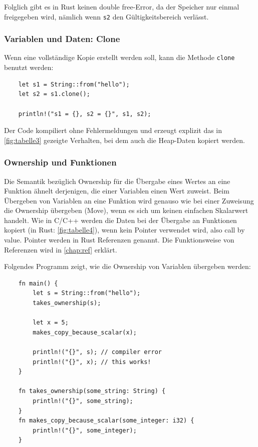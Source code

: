 Folglich gibt es in Rust keinen \glqq double free\grqq{}-Error, da der Speicher nur einmal freigegeben wird, nämlich wenn \verb"s2" den Gültigkeitsbereich verlässt.

\newpage

\subsubsection{Variablen und Daten: Clone}

Wenn eine vollständige Kopie erstellt werden soll, kann die Methode \verb"clone" benutzt werden:

\begin{lstlisting}
    let s1 = String::from("hello");
    let s2 = s1.clone();

    println!("s1 = {}, s2 = {}", s1, s2);
\end{lstlisting}

Der Code kompiliert ohne Fehlermeldungen und erzeugt explizit das in \autoref{fig:tabelle3} gezeigte Verhalten, bei dem auch die Heap-Daten kopiert werden.

\subsubsection{Ownership und Funktionen}

Die Semantik bezüglich Ownership für die Übergabe eines Wertes an eine Funktion ähnelt derjenigen, die einer Variablen einen Wert zuweist. Beim Übergeben von Variablen an eine Funktion wird genauso wie bei einer Zuweisung die Ownership übergeben (Move), wenn es sich um keinen einfachen Skalarwert handelt. Wie in C/C++ werden die Daten bei der Übergabe an Funktionen kopiert (in Rust: \autoref{fig:tabelle4}), wenn kein Pointer verwendet wird, also \glqq call by value\grqq{}. Pointer werden in Rust Referenzen genannt. Die Funktionsweise von Referenzen wird in \autoref{chap:ref} erklärt.

Folgendes Programm zeigt, wie die Ownership von Variablen übergeben werden:

\begin{lstlisting}
    fn main() {
        let s = String::from("hello");
        takes_ownership(s);

        let x = 5;
        makes_copy_because_scalar(x);

        println!("{}", s); // compiler error
        println!("{}", x); // this works!
    }

    fn takes_ownership(some_string: String) {
        println!("{}", some_string);
    }
    fn makes_copy_because_scalar(some_integer: i32) {
        println!("{}", some_integer);
    }
\end{lstlisting}

